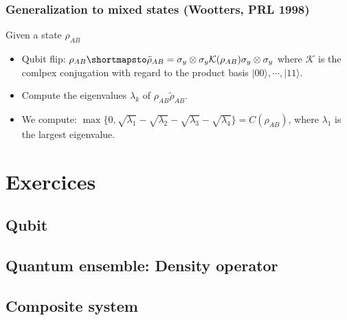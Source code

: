 \documentclass[12pt]{book}
\theoremstyle{definition}
\let\mapsto\shortmapsto
\newcommand{\mapsto}{\longmapsto}
\newcommand{\si}{\sigma}
\newcommand{\ket}[1]{\vert {#1} \rangle}
\begin{document}
\subsection{Generalization to mixed states (Wootters, PRL 1998)}
Given a state $\rho_{AB}$
\begin{itemize}
  \item Qubit flip: $\rho_{AB} \mapsto \tilde \rho_{AB} = \si_y \otimes \si_y \mathcal K(\rho_{AB}) \si_y \otimes\si_y$ where $\mathcal K$ is the comlpex conjugation with regard to the product basis $\ket{00}, \cdots, \ket{11}$.
  \item Compute the eigenvalues $\lambda_k$ of $\rho_{AB}\tilde \rho_{AB}$.
  \item We compute: $\max\{0, \sqrt{\lambda_1} - \sqrt{\lambda_2} - \sqrt{\lambda_3} - \sqrt{\lambda_4}\} = C(\rho_{AB})$, where $\lambda_1$ is the largest eigenvalue. 
\end{itemize}



\appendix
\chapter{Exercices}
\section{Qubit}

\section{Quantum ensemble: Density operator}

\section{Composite system}
\end{document}

